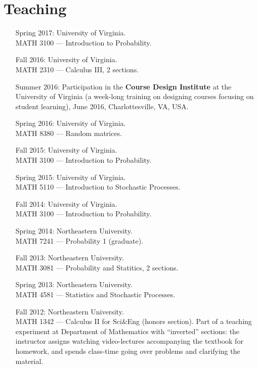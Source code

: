 \documentclass[letterpaper,11pt]{article}
\begin{document}
\section*{Teaching}

\begin{itemize}
	\item
	      [Spring 2017:]
	      University of Virginia. \\ MATH 3100 --- Introduction to
	      Probability.

	\item
	      [Fall 2016:]
	      University of Virginia. \\ MATH 2310 --- Calculus III, 2
	      sections.

	\item
	      [Summer 2016:] Participation in the \textbf{Course Design
		      Institute} at
	      the University of Virginia (a week-long training on designing
	      courses focusing on student learning), June 2016, Charlottesville, VA, USA.

	\item
	      [Spring 2016:]
	      University of Virginia. \\ MATH 8380 --- Random matrices.

	\item
	      [Fall 2015:]
	      University of Virginia. \\ MATH 3100 --- Introduction to
	      Probability.

	\item
	      [Spring 2015:]
	      University of Virginia. \\ MATH 5110 --- Introduction to
	      Stochastic Processes.

	\item
	      [Fall 2014:]
	      University of Virginia. \\ MATH 3100 --- Introduction to
	      Probability.

	\item
	      [Spring 2014:]
	      Northeastern University. \\ MATH 7241 --- Probability 1
	      (graduate).

	\item
	      [Fall 2013:]
	      Northeastern University. \\ MATH 3081 --- Probability and
	      Statitics, 2 sections.
	\item
	      [Spring 2013:]
	      Northeastern University. \\ MATH 4581 --- Statistics and
	      Stochastic Processes.
	\item
	      [Fall 2012:]
	      Northeastern University. \\ MATH 1342 --- Calculus II for
	      Sci\&Eng (honors section). Part of a teaching experiment at Department of
	      Mathematics with ``inverted'' sections: the instructor assigns watching
	      video-lectures accompanying the textbook for homework, and spends class-time
	      going over problems and clarifying the material.


\end{itemize}
\end{document}
